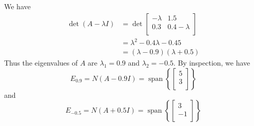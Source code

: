 \documentclass{article}
\DeclareMathOperator{\spn}{span}
\begin{document}
\begin{example}
  We have
  \begin{align*}
    \det (A - \lambda I) & = \det
    \begin{bmatrix}
      -\lambda & 1.5           \\
      0.3      & 0.4 - \lambda \\
    \end{bmatrix}                                \\
                         & = \lambda^2 - 0.4\lambda -0.45   \\
                         & = (\lambda - 0.9)(\lambda + 0.5)
  \end{align*}
  Thus the eigenvalues of $A$ are $\lambda_1 = 0.9$ and $\lambda_2 = -0.5$. By inspection, we have \[
    E_{0.9} = N(A - 0.9I) = \spn\left\{
    \begin{bmatrix}
      5 \\3\\
    \end{bmatrix}\right\}
  \] and \[
    E_{-0.5} = N(A + 0.5I) = \spn\left\{
    \begin{bmatrix}
      3 \\-1\\
    \end{bmatrix}\right\}
  \]


\end{example}
\end{document}
